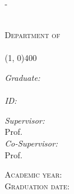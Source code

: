 \begin{titlingpage}
\begin{adjustwidth}{\unitlength}{-\unitlength}
\begin{center}
			{\scshape \Large{\bfseries{\UnivName}}} \\
			{\scshape \large{Department of \DeptName}} \\
			\vspace{3pt}
			{\scshape \large{\textit{\DegreeName}}} \\
			\line(1, 0){400} \\

			\vspace{1cm}
			{\huge{\bfseries{\textcolor{SchoolColor}{\Title}}} \par}\vspace{0.7cm} %
			\vspace{1cm}

			\begin{minipage}[t]{0.3\textwidth}
				\begin{flushleft} \large
					\emph{Graduate:}\\
					\textcolor{SchoolColor}{\AuthorName \ \textsc{\AuthorSurname}} %
					\\
					\emph{ID:} \textsc{\StudentId}
				\end{flushleft}
			\end{minipage}
			\begin{minipage}[t]{0.68\textwidth}
				\begin{flushright} \large
					\emph{Supervisor:} \\
					\textcolor{SchoolColor}{Prof. \SupName \ \textsc{\SupSurname}} %
					\vspace{10pt}\\
					\emph{Co-Supervisor:} \\
					\textcolor{SchoolColor}{Prof. \CosupName \ \textsc{\CosupSurname}} %
				\end{flushright}
			\end{minipage}

			\vfill
			\large{\textsc{Academic year:} \quad \AcademicYear}\\
			\large{\textsc{Graduation date:} \quad \GraduationDate}
		\end{center}
	\end{adjustwidth}
\end{titlingpage}
